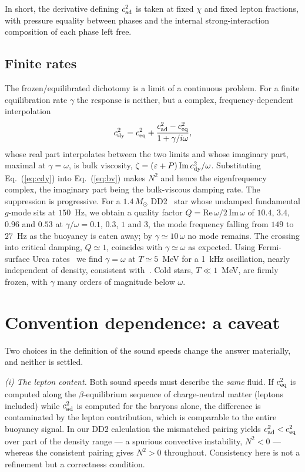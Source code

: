 \documentclass[aps,prd,twocolumn,superscriptaddress,nofootinbib,10pt]{revtex4-2}
\begin{document}
In short, the derivative defining $c_{\rm ad}^{2}$ is taken at fixed $\chi$ and
fixed lepton fractions, with pressure equality between phases and the internal
strong-interaction composition of each phase left free.

\subsection{Finite rates}

The frozen/equilibrated dichotomy is a limit of a continuous problem. For a
finite equilibration rate $\gamma$ the response is neither, but a complex,
frequency-dependent interpolation~\cite{Counsell2025}
\begin{equation}
  c_{\rm dy}^{2} = c_{\rm eq}^{2}
    + \frac{c_{\rm ad}^{2}-c_{\rm eq}^{2}}{1+\gamma/i\omega},
  \label{eq:cdy}
\end{equation}
whose real part interpolates between the two limits and whose imaginary part,
maximal at $\gamma=\omega$, is bulk viscosity,
$\zeta=(\varepsilon+P)\,{\rm Im}\,c_{\rm dy}^{2}/\omega$. Substituting
Eq.~(\ref{eq:cdy}) into Eq.~(\ref{eq:bv}) makes $N^{2}$ and hence the
eigenfrequency complex, the imaginary part being the bulk-viscous damping rate.
The suppression is progressive. For a $1.4\,M_{\odot}$ DD2~\cite{Typel2010}
star whose undamped fundamental $g$-mode sits at $150$~Hz, we obtain a quality
factor $Q=\mathrm{Re}\,\omega/2\,\mathrm{Im}\,\omega$ of $10.4$, $3.4$, $0.96$
and $0.53$ at $\gamma/\omega=0.1$, $0.3$, $1$ and $3$, the mode frequency
falling from $149$ to $27$~Hz as the buoyancy is eaten away; by
$\gamma\simeq10\,\omega$ no mode remains. The crossing into critical damping,
$Q\simeq1$, coincides with $\gamma\simeq\omega$ as expected. Using
Fermi-surface Urca rates~\cite{AlfordHarris2018,Alford2020} we find
$\gamma=\omega$ at $T\simeq5$~MeV for a 1~kHz oscillation, nearly independent
of density, consistent with~\cite{AlfordHarris2019}. Cold stars, $T\ll1$~MeV,
are firmly frozen, with $\gamma$ many orders of magnitude below $\omega$.

\section{Convention dependence: a caveat}

Two choices in the definition of the sound speeds change the answer materially,
and neither is settled.

\emph{(i) The lepton content.} Both sound speeds must describe the \emph{same}
fluid. If $c_{\rm eq}^{2}$ is computed along the $\beta$-equilibrium sequence of
charge-neutral matter (leptons included) while $c_{\rm ad}^{2}$ is computed for
the baryons alone, the difference is contaminated by the lepton contribution,
which is comparable to the entire buoyancy signal. In our DD2 calculation the
mismatched pairing yields $c_{\rm ad}^{2}<c_{\rm eq}^{2}$ over part of the
density range --- a spurious convective instability, $N^{2}<0$ --- whereas the
consistent pairing gives $N^{2}>0$ throughout. Consistency here is not a
refinement but a correctness condition.
\end{document}
